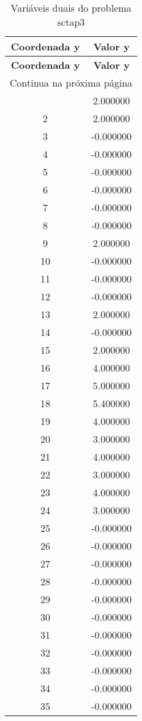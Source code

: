 \documentclass[12pt]{article}
\begin{document}
\begin{longtable}{@{}cc@{}}
\caption{Variáveis duais do problema sctap3} \\
\toprule
\textbf{Coordenada y} & \textbf{Valor y} \\
\midrule
\endfirsthead

\toprule
\textbf{Coordenada y} & \textbf{Valor y} \\
\midrule
\endhead

\midrule \multicolumn{2}{r}{{Continua na próxima página}} \\ \midrule
\endfoot

\bottomrule
\endlastfoot
1 & 2.000000 \\
2 & 2.000000 \\
3 & -0.000000 \\
4 & -0.000000 \\
5 & -0.000000 \\
6 & -0.000000 \\
7 & -0.000000 \\
8 & -0.000000 \\
9 & 2.000000 \\
10 & -0.000000 \\
11 & -0.000000 \\
12 & -0.000000 \\
13 & 2.000000 \\
14 & -0.000000 \\
15 & 2.000000 \\
16 & 4.000000 \\
17 & 5.000000 \\
18 & 5.400000 \\
19 & 4.000000 \\
20 & 3.000000 \\
21 & 4.000000 \\
22 & 3.000000 \\
23 & 4.000000 \\
24 & 3.000000 \\
25 & -0.000000 \\
26 & -0.000000 \\
27 & -0.000000 \\
28 & -0.000000 \\
29 & -0.000000 \\
30 & -0.000000 \\
31 & -0.000000 \\
32 & -0.000000 \\
33 & -0.000000 \\
34 & -0.000000 \\
35 & -0.000000 \\

\end{longtable}
\end{document}
